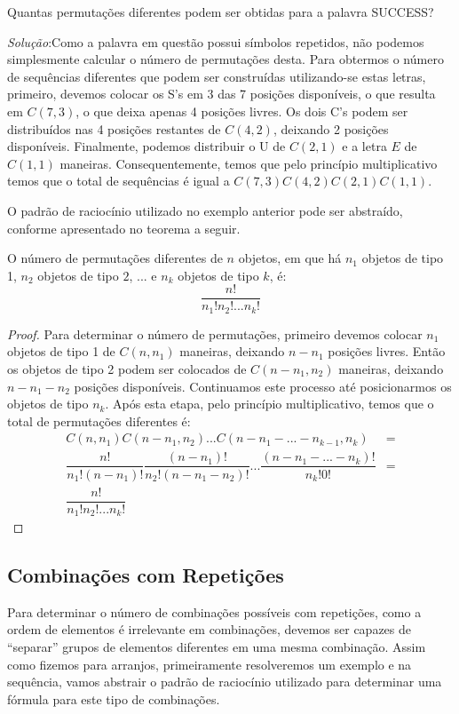 \begin{Example}
Quantas permutações diferentes podem ser obtidas para a palavra
SUCCESS?

\textit{Solução}:Como a palavra em questão possui símbolos repetidos,
não podemos simplesmente calcular o número de permutações desta. Para
obtermos o número de sequências diferentes que podem ser construídas
utilizando-se estas letras, primeiro, devemos colocar os S's em 3 das
7 posições disponíveis, o que resulta em $C(7,3)$, o que deixa apenas
4 posições livres. Os dois C's podem ser distribuídos nas 4 posições
restantes de $C(4,2)$, deixando 2 posições disponíveis. Finalmente,
podemos distribuir o U de $C(2,1)$ e a letra $E$ de $C(1,1)$ maneiras.
Consequentemente, temos que pelo princípio multiplicativo temos que o
total de sequências é igual a $C(7,3)C(4,2)C(2,1)C(1,1)$.
\end{Example}
O padrão de raciocínio utilizado no exemplo anterior pode ser
abstraído, conforme apresentado no teorema a seguir.
\begin{Theorem}
O número de permutações diferentes de $n$ objetos, em que há $n_1$
objetos de tipo 1, $n_2$ objetos de tipo $2$, ... e $n_k$ objetos de tipo
$k$, é:
\[
\dfrac{n!}{n_1!n_2!...n_k!}
\]
\end{Theorem}
\begin{proof}
Para determinar o número de permutações, primeiro devemos colocar
$n_1$ objetos de tipo 1 de $C(n,n_1)$ maneiras, deixando $n - n_1$
posições livres. Então os objetos de tipo 2 podem ser colocados de
$C(n - n_1,n_2)$ maneiras, deixando $n - n_1 - n_2$ posições
disponíveis. Continuamos este processo até posicionarmos os objetos de
tipo $n_k$. Após esta etapa, pelo princípio multiplicativo, temos que
o total de permutações diferentes é:
\[
\begin{array}{lc}
C(n,n_1) C(n - n_1, n_2) ... C(n - n_1 - ... - n_{k - 1},n_k) & = \\
\dfrac{n!}{n_1!(n - n_1)!}\dfrac{(n- n_1)!}{n_2!(n - n_1 - n_2)!}
... \dfrac{(n - n_1 - ... -n_k)!}{n_k! 0!} & = \\
\dfrac{n!}{n_1!n_2!...n_k!}
\end{array}
\]
\end{proof}

\subsection{Combinações com Repetições}

Para determinar o número de combinações possíveis com repetições, como
a ordem de elementos é irrelevante em combinações, devemos ser capazes
de ``separar'' grupos de elementos diferentes em uma mesma combinação.
Assim como fizemos para arranjos, primeiramente resolveremos um
exemplo e na sequência, vamos abstrair o padrão de raciocínio
utilizado para determinar uma fórmula para este tipo de combinações.

